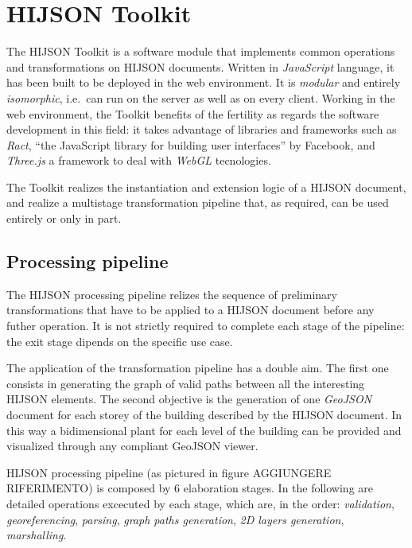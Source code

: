 
\section{HIJSON Toolkit}\label{hijson-toolkit}

The HIJSON Toolkit is a software module that implements common
operations and transformations on HIJSON documents. Written in
\emph{JavaScript} language, it has been built to be deployed in the web
environment. It is \emph{modular} and entirely \emph{isomorphic},
i.e.~can run on the server as well as on every client. Working in the
web environment, the Toolkit benefits of the fertility as regards the
software development in this field: it takes advantage of libraries and
frameworks such as \emph{Ract}, ``the JavaScript library for building
user interfaces'' by Facebook, and \emph{Three.js} a framework to deal
with \emph{WebGL} tecnologies.

The Toolkit realizes the instantiation and extension logic of a HIJSON
document, and realize a multistage transformation pipeline that, as required,
can be used entirely or only in part.

\subsection{Processing pipeline}\label{hijson-processing-pipeline}

The HIJSON processing pipeline relizes the sequence of preliminary
transformations that have to be applied to a HIJSON document before any
futher operation. It is not strictly required to complete each stage of
the pipeline: the exit stage dipends on the specific use case.

The application of the transformation pipeline has a double aim. The first one
consists in generating the graph of valid paths between all the interesting
HIJSON elements. The second objective is the generation of one \emph{GeoJSON}
document for each storey of the building described by the HIJSON document. In
this way a bidimensional plant for each level of the building can be provided
and visualized through any compliant GeoJSON viewer.

HIJSON processing pipeline (as pictured in figure AGGIUNGERE
RIFERIMENTO) is composed by 6 elaboration stages. In the following are
detailed operations excecuted by each stage, which are, in the order:
\emph{validation}, \emph{georeferencing}, \emph{parsing}, \emph{graph
paths generation}, \emph{2D layers generation}, \emph{marshalling}.

